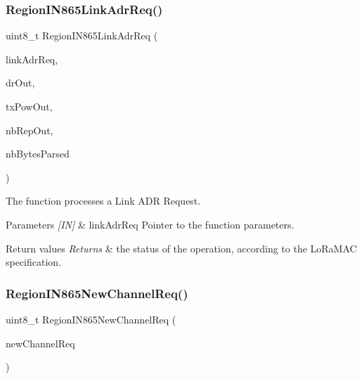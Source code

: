 \subsubsection{\texorpdfstring{Region\+I\+N865\+Link\+Adr\+Req()}{RegionIN865LinkAdrReq()}}
{\footnotesize\ttfamily uint8\+\_\+t Region\+I\+N865\+Link\+Adr\+Req (\begin{DoxyParamCaption}\item[{\hyperlink{group__REGION_gad4af503e8d4de1846129e26a799a1e8e}{Link\+Adr\+Req\+Params\+\_\+t} $\ast$}]{link\+Adr\+Req,  }\item[{int8\+\_\+t $\ast$}]{dr\+Out,  }\item[{int8\+\_\+t $\ast$}]{tx\+Pow\+Out,  }\item[{uint8\+\_\+t $\ast$}]{nb\+Rep\+Out,  }\item[{uint8\+\_\+t $\ast$}]{nb\+Bytes\+Parsed }\end{DoxyParamCaption})}



The function processes a Link A\+DR Request. 


\begin{DoxyParams}{Parameters}
{\em \mbox{[}\+I\+N\mbox{]}} & link\+Adr\+Req Pointer to the function parameters.\\
\hline
\end{DoxyParams}

\begin{DoxyRetVals}{Return values}
{\em Returns} & the status of the operation, according to the Lo\+Ra\+M\+AC specification. \\
\hline
\end{DoxyRetVals}
\mbox{\label{group__REGIONIN865_ga5448e91593496677753ad6600cedadc5}} 
\subsubsection{\texorpdfstring{Region\+I\+N865\+New\+Channel\+Req()}{RegionIN865NewChannelReq()}}
{\footnotesize\ttfamily uint8\+\_\+t Region\+I\+N865\+New\+Channel\+Req (\begin{DoxyParamCaption}\item[{\hyperlink{group__REGION_gae2abcdb6dbb843c9faf5fd3009eca9d6}{New\+Channel\+Req\+Params\+\_\+t} $\ast$}]{new\+Channel\+Req }\end{DoxyParamCaption})}



